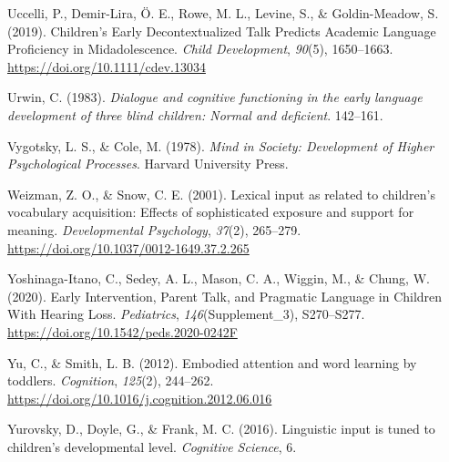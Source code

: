 \documentclass[
  man,floatsintext]{apa6}
\newlength{\cslhangindent}
\newlength{\cslentryspacingunit} %
\newenvironment{CSLReferences}[2] %
 {%
  \setlength{\parindent}{0pt}
  \ifodd #1
  \let\oldpar\par
  \def\par{\hangindent=\cslhangindent\oldpar}
  \fi
  \setlength{\parskip}{#2\cslentryspacingunit}
 }%
 {}
\begin{document}
\begin{CSLReferences}{1}{0}
\leavevmode{}%
Uccelli, P., Demir-Lira, Ö. E., Rowe, M. L., Levine, S., \& Goldin-Meadow, S. (2019). Children's {Early Decontextualized Talk Predicts Academic Language Proficiency} in {Midadolescence}. \emph{Child Development}, \emph{90}(5), 1650--1663. \url{https://doi.org/10.1111/cdev.13034}

\leavevmode{}%
Urwin, C. (1983). \emph{Dialogue and cognitive functioning in the early language development of three blind children: {Normal} and deficient}. 142--161.

\leavevmode{}%
Vygotsky, L. S., \& Cole, M. (1978). \emph{Mind in {Society}: {Development} of {Higher Psychological Processes}}. {Harvard University Press}.

\leavevmode{}%
Weizman, Z. O., \& Snow, C. E. (2001). Lexical input as related to children's vocabulary acquisition: Effects of sophisticated exposure and support for meaning. \emph{Developmental Psychology}, \emph{37}(2), 265--279. \url{https://doi.org/10.1037/0012-1649.37.2.265}

\leavevmode{}%
Yoshinaga-Itano, C., Sedey, A. L., Mason, C. A., Wiggin, M., \& Chung, W. (2020). Early {Intervention}, {Parent Talk}, and {Pragmatic Language} in {Children With Hearing Loss}. \emph{Pediatrics}, \emph{146}(Supplement\_3), S270--S277. \url{https://doi.org/10.1542/peds.2020-0242F}

\leavevmode{}%
Yu, C., \& Smith, L. B. (2012). Embodied attention and word learning by toddlers. \emph{Cognition}, \emph{125}(2), 244--262. \url{https://doi.org/10.1016/j.cognition.2012.06.016}

\leavevmode{}%
Yurovsky, D., Doyle, G., \& Frank, M. C. (2016). Linguistic input is tuned to children's developmental level. \emph{Cognitive Science}, 6.

\end{CSLReferences}
\end{document}
